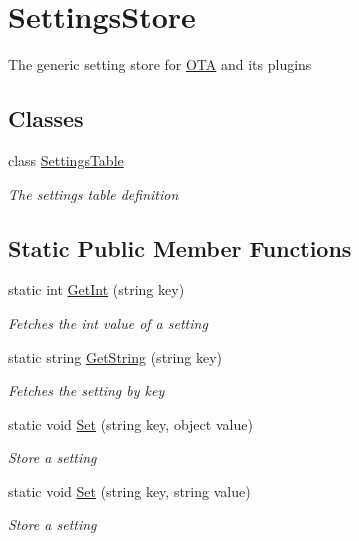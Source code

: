 \hypertarget{classOTA_1_1Data_1_1SettingsStore}{}\section{Settings\+Store}
\label{classOTA_1_1Data_1_1SettingsStore}


The generic setting store for \hyperlink{namespaceOTA}{O\+T\+A} and its plugins  


\subsection*{Classes}
\begin{DoxyCompactItemize}
\item 
class \hyperlink{classOTA_1_1Data_1_1SettingsStore_1_1SettingsTable}{Settings\+Table}
\begin{DoxyCompactList}\small\item\em The settings table definition \end{DoxyCompactList}\end{DoxyCompactItemize}
\subsection*{Static Public Member Functions}
\begin{DoxyCompactItemize}
\item 
static int \hyperlink{classOTA_1_1Data_1_1SettingsStore_a0caa7d7e37b4f28cbe2b4039f73dfe54}{Get\+Int} (string key)
\begin{DoxyCompactList}\small\item\em Fetches the int value of a setting \end{DoxyCompactList}\item 
static string \hyperlink{classOTA_1_1Data_1_1SettingsStore_ac984a5da1e145ef9494a2d2d7cd968ac}{Get\+String} (string key)
\begin{DoxyCompactList}\small\item\em Fetches the setting by key \end{DoxyCompactList}\item 
static void \hyperlink{classOTA_1_1Data_1_1SettingsStore_ab7e8e83303901246e452805868d65f9f}{Set} (string key, object value)
\begin{DoxyCompactList}\small\item\em Store a setting \end{DoxyCompactList}\item 
static void \hyperlink{classOTA_1_1Data_1_1SettingsStore_accb9f246d88e106ddd436ccfb067a562}{Set} (string key, string value)
\begin{DoxyCompactList}\small\item\em Store a setting \end{DoxyCompactList}\end{DoxyCompactItemize}
